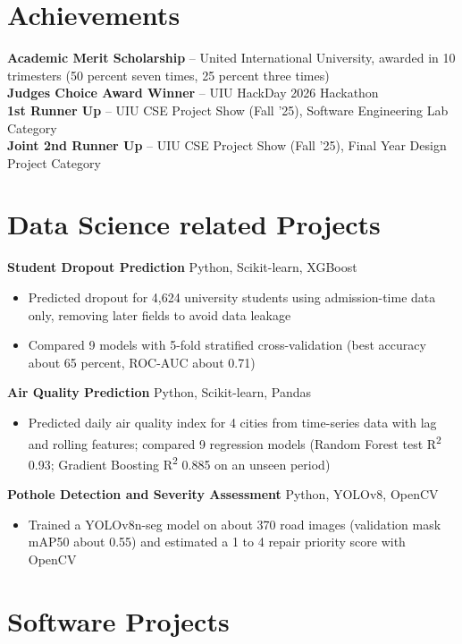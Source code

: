 \documentclass[10pt,a4paper]{article}
\begin{document}
\section*{Achievements}

\textbf{Academic Merit Scholarship} -- United International University, awarded in 10 trimesters (50 percent seven times, 25 percent three times) \\
\textbf{Judges Choice Award Winner} -- UIU HackDay 2026 Hackathon \\
\textbf{1st Runner Up} -- UIU CSE Project Show (Fall '25), Software Engineering Lab Category \\
\textbf{Joint 2nd Runner Up} -- UIU CSE Project Show (Fall '25), Final Year Design Project Category

\section*{Data Science related Projects}

\textbf{Student Dropout Prediction} \hfill Python, Scikit-learn, XGBoost
\begin{itemize}
    \item Predicted dropout for 4,624 university students using admission-time data only, removing later fields to avoid data leakage
    \item Compared 9 models with 5-fold stratified cross-validation (best accuracy about 65 percent, ROC-AUC about 0.71)
\end{itemize}

\textbf{Air Quality Prediction} \hfill Python, Scikit-learn, Pandas
\begin{itemize}
    \item Predicted daily air quality index for 4 cities from time-series data with lag and rolling features; compared 9 regression models (Random Forest test R\textsuperscript{2} 0.93; Gradient Boosting R\textsuperscript{2} 0.885 on an unseen period)
\end{itemize}

\textbf{Pothole Detection and Severity Assessment} \hfill Python, YOLOv8, OpenCV
\begin{itemize}
    \item Trained a YOLOv8n-seg model on about 370 road images (validation mask mAP50 about 0.55) and estimated a 1 to 4 repair priority score with OpenCV
\end{itemize}

\section*{Software Projects}
\end{document}

